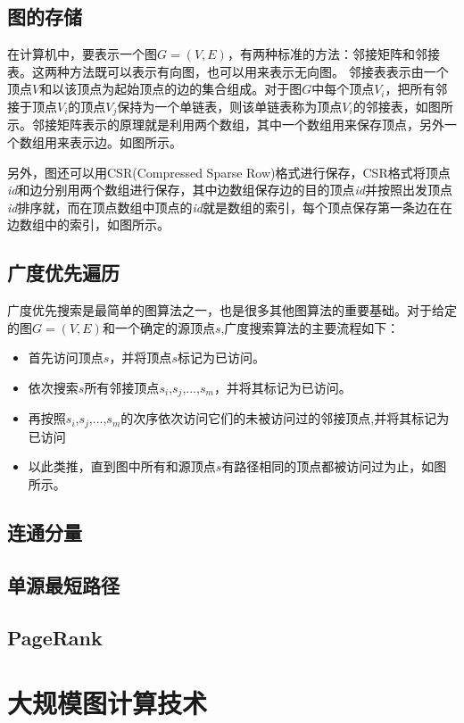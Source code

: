 \subsection{图的存储}
在计算机中，要表示一个图$G=(V,E)$，有两种标准的方法：邻接矩阵和邻接表。这两种方法既可以表示有向图，也可以用来表示无向图。
邻接表表示由一个顶点$V$和以该顶点为起始顶点的边的集合组成。对于图$G$中每个顶点$V$$_i$，把所有邻接于顶点$V$$_i$的顶点$V$$_j$保持为一个单链表，则该单链表称为顶点$V$$_i$的邻接表，如图所示。邻接矩阵表示的原理就是利用两个数组，其中一个数组用来保存顶点，另外一个数组用来表示边。如图所示。

另外，图还可以用CSR(Compressed Sparse Row)格式进行保存，CSR格式将顶点\textit{id}和边分别用两个数组进行保存，其中边数组保存边的目的顶点\textit{id}并按照出发顶点\textit{id}排序就，而在顶点数组中顶点的\textit{id}就是数组的索引，每个顶点保存第一条边在在边数组中的索引，如图所示。


\subsection{广度优先遍历}
广度优先搜索是最简单的图算法之一，也是很多其他图算法的重要基础。对于给定的图$G=(V,E)$和一个确定的源顶点$s$,广度搜索算法的主要流程如下：
\begin{itemize}
\item 首先访问顶点$s$，并将顶点$s$标记为已访问。
\item 依次搜索$s$所有邻接顶点$s_i$,$s_j$,...,$s_m$，并将其标记为已访问。
\item 再按照$s_i$,$s_j$,...,$s_m$的次序依次访问它们的未被访问过的邻接顶点,并将其标记为已访问
\item 以此类推，直到图中所有和源顶点$s$有路径相同的顶点都被访问过为止，如图所示。
\end{itemize}


\subsection{连通分量}
\subsection{单源最短路径}
\subsection{PageRank}

\section{大规模图计算技术}
